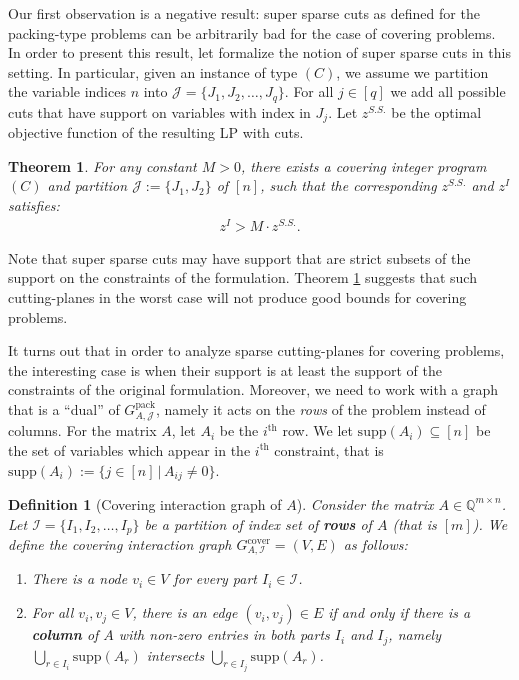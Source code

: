 \documentclass[smallextended]{svjour3}
\newtheorem{definition}[proposition]{Definition}
\newtheorem{theorem}[proposition]{Theorem}
\begin{document}
Our first observation is a negative result: super sparse cuts as defined for the packing-type problems can be arbitrarily bad for the case of covering problems. In order to present this result, let formalize the notion of super sparse cuts in this setting. In particular, given an instance of type $(C)$, we assume we partition the variable indices $n$ into $\mathcal{J}  = \{J_1, J_2, \dots, J_q\}$. For all $j \in [q]$ we add all possible cuts that have support on variables with index in $J_j$. Let $z^{S.S.}$ be the optimal objective function of the resulting LP with cuts. 

\begin{theorem}\label{thm:coversupersparse}
For any constant $M >0$, there exists a covering integer program $(C)$ and partition $\mathcal{J}:= \{J_1, J_2\}$ of $[n]$, such that the corresponding $z^{S.S.}$ and $z^I$ satisfies:
	\begin{eqnarray*}
		z^I > M \cdot z^{S.S.}.
	\end{eqnarray*}
\end{theorem}

Note that super sparse cuts may have support that are strict subsets of the support on the constraints of the formulation. Theorem \ref{thm:coversupersparse} suggests that such cutting-planes in the worst case will not produce good bounds for covering problems. 

It turns out that in order to analyze sparse cutting-planes for covering problems, the interesting case is when their support is at least the support of the constraints of the original formulation. Moreover, we need to work with a graph that is a ``dual'' of ${G^{\textrm{pack}}_{A, {\mathcal{J}}}}$, namely it acts on the \emph{rows} of the problem instead of columns. For the matrix $A$, let $A_i$ be the $i^{\textrm{th}}$ row. We let ${\textrm{supp}}(A_i) \subseteq [n]$ be the set of variables which appear in the $i^{\textrm{th}}$ constraint, that is ${\textrm{supp}}(A_i) := \{j \in [n]\,|\, A_{ij} \neq 0\}$.

\begin{definition}[Covering interaction graph of $A$] Consider the matrix $A \in \mathbb{Q}^{m \times n}$. Let $\mathcal{I} = \{I_1, I_2, \dots, I_p\}$ be a partition of index set of \textbf{rows} of $A$ (that is $[m]$). We define the \emph{covering interaction graph} ${G^{\textrm{cover}}_{A, {\mathcal{I}}}} = (V, E)$ as follows:
\begin{enumerate}
\item There is a node $v_i \in V$ for every part $I_i \in \mathcal{I}$.
\item For all $v_i, v_j \in V$, there is an edge $(v_i, v_j) \in E$ if and only if there is a \textbf{column} of $A$ with non-zero entries in both parts $I_i$ and $I_j$, namely $\bigcup_{r \in I_i} {\textrm{supp}}(A_r)$ intersects $\bigcup_{r \in I_j} {\textrm{supp}}(A_r)$.

\end{enumerate}
\end{definition}
\end{document}
